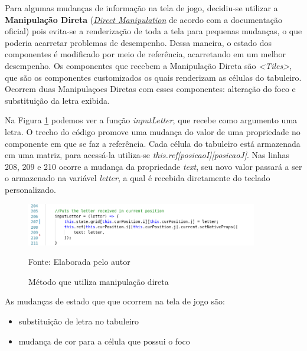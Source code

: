     

Para algumas mudanças de informação na tela de jogo, decidiu-se utilizar a \textbf{Manipulação Direta} (\href{https://reactnative.dev/docs/direct-manipulation}{\textit{Direct Manipulation}} de acordo com a documentação oficial) pois evita-se a renderização de toda a tela para pequenas mudanças, o que poderia acarretar problemas de desempenho. Dessa maneira, o estado dos componentes é modificado por meio de referência, acarretando em um melhor desempenho. Os componentes que recebem a Manipulação Direta são \textit{<Tiles>}, que são os componentes customizados os quais renderizam as células do tabuleiro. Ocorrem duas Manipulaçoes Diretas com esses componentes: alteração do foco e substituição da letra exibida.

Na Figura \ref{fig:codeDirectManipulation} podemos ver a função \textit{inputLetter}, que recebe como argumento uma letra. O trecho do código promove uma mudança do valor de uma propriedade no componente em que se faz a referência. Cada célula do tabuleiro está armazenada em uma matriz, para acessá-la utiliza-se \textit{this.ref[posicaoI][posicaoJ]}. Nas linhas 208, 209 e 210 ocorre a mudança da propriedade \textit{text}, seu novo valor passará a ser o armazenado na variável \textit{letter}, a qual é recebida diretamente do teclado personalizado.

\begin{figure}[H]
\centering
    \caption{Método que utiliza manipulação direta}
    \label{fig:codeDirectManipulation}
    \includegraphics[width=0.9\textwidth]{Figuras/codeDirectManipulation.png}
    
    Fonte: Elaborada pelo autor
\end{figure}

As mudanças de estado que que ocorrem na tela de jogo são:

\begin{itemize}
    \item substituição de letra no tabuleiro
    \item mudança de cor para a célula que possui o foco
\end{itemize}
